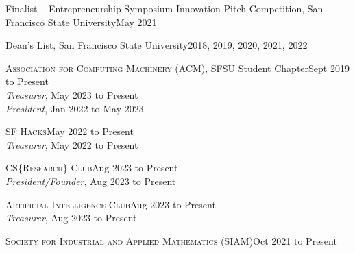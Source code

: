 \documentclass[hidelinks, 10pt]{article}
\begin{document}
{\begin{minipage}[ct]{0.9\linewidth}
\vspace{1.5mm}

Finalist -- Entrepreneurship Symposium Innovation Pitch Competition, San
Francisco State University\hfill May 2021

\vspace{1.5mm}

Dean's List, San Francisco State University\hfill 2018, 2019, 2020, 2021, 2022
\end{minipage}
    
\vspace{7mm}


\hrulefill

\vspace{4mm}

\begin{minipage}[ct]{0.9\linewidth}
\textsc{Association for Computing Machinery} (ACM), SFSU Student Chapter\hfill Sept 2019 to
Present\\
\emph{Treasurer}, May 2023 to Present\\
\emph{President}, Jan 2022 to May 2023

\vspace{1.5mm}

\textsc{SF Hacks}\hfill May 2022 to Present\\
\emph{Treasurer}, May 2022 to Present

\vspace{1.5mm}

\textsc{CS}\{\textsc{Research}\}\textsc{ Club}\hfill Aug 2023 to Present\\
\emph{President/Founder}, Aug 2023 to Present

\vspace{1.5mm}

\textsc{Artificial Intelligence Club}\hfill Aug 2023 to Present\\
\emph{Treasurer}, Aug 2023 to Present

\vspace{1.5mm}

\textsc{Society for Industrial and Applied Mathematics} (SIAM)\hfill Oct 2021 to Present\\
\end{minipage}

\vspace{4mm}
\pagebreak

}
\end{document}
